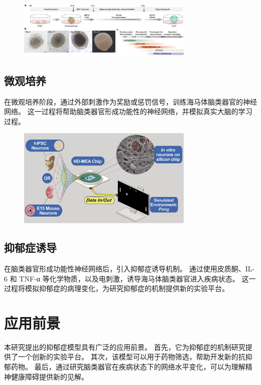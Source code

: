 \begin{figure}[!htbp]
    \centering
    \includegraphics[width=0.75\textwidth]{Img/hipp-organoid.jpg}
    \label{fig:hipp-organoid}
\end{figure}

\subsection{微观培养}\label{subsec:micro-culture}
在微观培养阶段，通过外部刺激作为奖励或惩罚信号，训练海马体脑类器官的神经网络。
这一过程将帮助脑类器官形成功能性的神经网络，并模拟真实大脑的学习过程。

\begin{figure}[!htbp]
    \centering
    \includegraphics[width=0.75\textwidth]{Img/demo-dishbarin.png}
    \label{fig:demo-dishbarin}
\end{figure}

\subsection{抑郁症诱导}\label{subsec:depression-induction}
在脑类器官形成功能性神经网络后，引入抑郁症诱导机制。
通过使用皮质酮、IL-6 和 TNF-α 等化学物质，以及电刺激，诱导海马体脑类器官进入疾病状态。
这一过程将模拟抑郁症的病理变化，为研究抑郁症的机制提供新的实验平台。


\section{应用前景}\label{sec:application-prospect}
本研究提出的抑郁症模型具有广泛的应用前景。
首先，它为抑郁症的机制研究提供了一个创新的实验平台。
其次，该模型可以用于药物筛选，帮助开发新的抗抑郁药物。
最后，通过研究脑类器官在疾病状态下的网络水平变化，可以为理解精神健康障碍提供新的见解。


